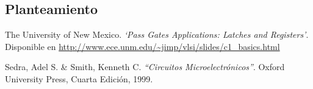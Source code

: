 \documentclass[twocolumn]{IEEEtran}
\begin{document}
\subsection{Planteamiento}
\noindent



\begin{thebibliography}{99} 
   The University of New Mexico.
  {\em `Pass Gates Applications: Latches and Registers'}.
  Disponible en \url{http://www.ece.unm.edu/~jimp/vlsi/slides/c1_basics.html}
  
   Sedra, Adel S. \& Smith, Kenneth C.
  {\em "`Circuitos Microelectrónicos"'}.
  Oxford University Press, Cuarta Edición, 1999.  
\end{thebibliography}
\end{document}
